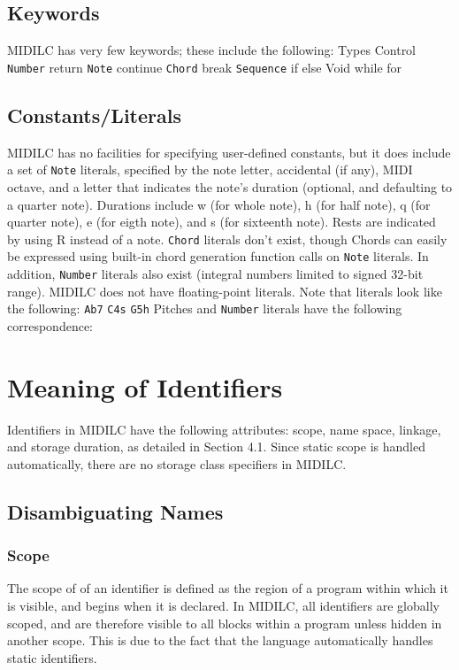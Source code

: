 \documentclass[12pt,A4]{book}
\begin{document}
\subsection{Keywords}
MIDILC has very few keywords; these include the following:
Types	Control
\verb|Number|	return
\verb|Note|	continue
\verb|Chord|	break
\verb|Sequence|	if
	else
Void	while
	for


\subsection{Constants/Literals}
MIDILC has no facilities for specifying user-defined constants, but it does include a set of \verb|Note| literals, specified by the note letter, accidental (if any), MIDI octave, and a letter that indicates the note’s duration (optional, and defaulting to a quarter note).  Durations include w (for whole note), h (for half note), q (for quarter note), e (for eigth note), and s (for sixteenth note).  Rests are indicated by using R instead of a note. \verb|Chord| literals don’t exist, though Chords can easily be expressed using built-in chord generation function calls on \verb|Note| literals.  In addition, \verb|Number| literals also exist (integral numbers limited to signed 32-bit range).  MIDILC does not have floating-point literals.
Note that literals look like the following:
\verb|Ab7|
\verb|C4s|
\verb|G5h|
Pitches and \verb|Number| literals have the following correspondence:

\section{Meaning of Identifiers}
Identifiers in MIDILC have the following attributes: scope, name space, linkage, and storage duration, as detailed in Section 4.1. Since static scope is handled automatically, there are no storage class specifiers in MIDILC.
\subsection{Disambiguating Names}
\subsubsection{Scope}
The scope of of an identifier is defined as the region of a program within which it is visible, and begins when it is declared. In MIDILC, all identifiers are globally scoped, and are therefore visible to all blocks within a program unless hidden in another scope. This is due to the fact that the language automatically handles static identifiers.
\end{document}
